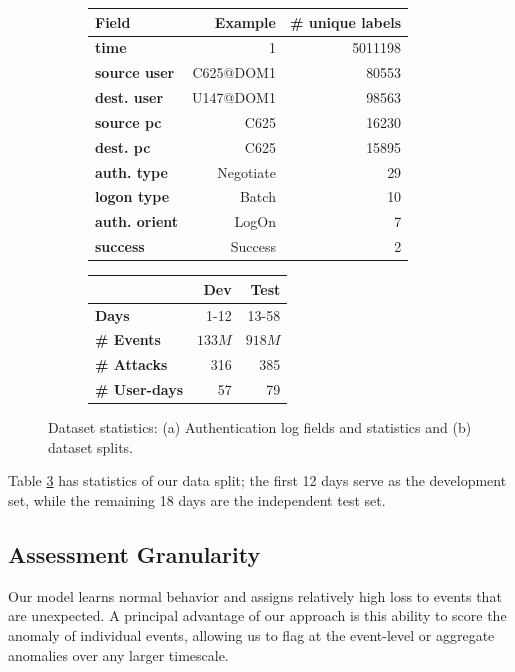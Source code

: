 \documentclass[letterpaper]{article} %
\begin{document}
\begin{figure}
\begin{subfigure}{0.47\textwidth}
\centering
    \begin{tabular}{|l|r|r|}\hline
         {\bf Field} & {\bf Example}  & {\bf \# unique labels} \\\hline
         {\bf time} & {1} & {5011198}  \\\hline
        {\bf source user} & {C625@DOM1}  & {80553}\\\hline
        {\bf dest. user} & {U147@DOM1} & {98563}  \\\hline
        {\bf source pc} & {C625}  & {16230} \\\hline
        {\bf dest. pc} & {C625}  & {15895} \\\hline
        {\bf auth. type} & {Negotiate} & {29} \\\hline
        {\bf logon type} & {Batch}  & {10} \\\hline
        {\bf auth. orient} & {LogOn}  & {7} \\\hline
        {\bf success} & {Success}  & {2} \\\hline
    \end{tabular}
    \caption{} \label{tab:auth}
\end{subfigure}
\begin{subfigure}{0.47\textwidth}
\centering
    \begin{tabular}{|l|r|r|}\hline
         {\bf } & {\bf Dev}  & {\bf Test} \\\hline
         {\bf Days} & {1-12} & {13-58}  \\\hline
        {\bf \# Events} & $133M$ & $918M$\\\hline
        {\bf \# Attacks} & 316 & 385  \\\hline
        {\bf \# User-days} & 57 & 79 \\\hline
    \end{tabular}
    \caption{} \label{tab:split}
\end{subfigure}
    \caption{Dataset statistics: (a) Authentication log fields and statistics and (b) dataset splits.}
\end{figure}


Table \ref{tab:split} has statistics of our data split; the first 12 days serve as the development set, while the remaining 18 days are the independent test set.

\subsection{Assessment Granularity} \label{subsec:detectinganomaly}
Our model learns normal behavior and assigns relatively high loss to events that are unexpected.
A principal advantage of our approach is this ability to score the anomaly of individual events, allowing us to flag at the event-level or aggregate anomalies over any larger timescale.
\end{document}
